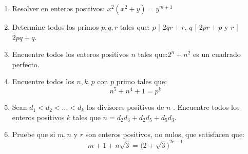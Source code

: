 \documentclass{book}
\begin{document}
\begin{enumerate}
    \item Resolver en enteros positivos: $x^2(x^2+y)=y^{m+1}$
    \item Determine todos los primos $p,q,r$ tales que: $p$ | $2qr+r$, $q$ | $2pr+p$ y $r$ | $2pq+q$.
    \item Encuentre todos los enteros positivos $n$ tales que:$2^n+n^2$ es un cuadrado perfecto.
    \item Encuentre todos los $n,k,p$ con $p$ primo tales que:
          $$n^5+n^4+1=p^k$$
    \item Sean $d_1<d_2< \ldots  <d_k$  los divisores positivos de $n$ . Encuentre todos los enteros positivos $k$  tales que                        $n=d_2d_3+d_2d_5+d_5d_3$.
    \item Pruebe que si $m,n$  y $r$  son enteros positivos, no nulos, que satisfacen que:
          $$m+1+n\sqrt{3}={\big(2+\sqrt{3}\big)}^{2r-1}$$
\end{enumerate}
\newpage
\end{document}
